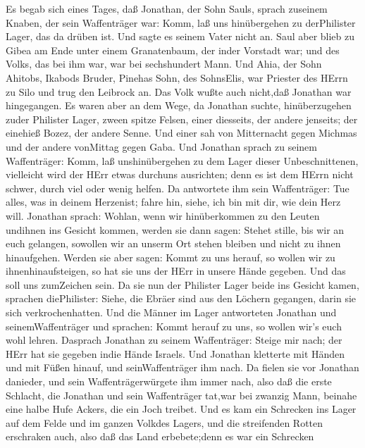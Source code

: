  Es begab sich eines Tages, daß Jonathan, der Sohn Sauls,
sprach zuseinem Knaben, der sein Waffenträger war: Komm, laß uns
hinübergehen zu derPhilister Lager, das da drüben ist. Und sagte es
seinem Vater nicht an.  Saul aber blieb zu Gibea am Ende
unter einem Granatenbaum, der inder Vorstadt war; und des Volks, das bei
ihm war, war bei sechshundert Mann.  Und Ahia, der Sohn
Ahitobs, Ikabods Bruder, Pinehas Sohn, des SohnsElis, war Priester des
HErrn zu Silo und trug den Leibrock an. Das Volk wußte auch nicht,daß
Jonathan war hingegangen.  Es waren aber an dem Wege, da
Jonathan suchte, hinüberzugehen zuder Philister Lager, zween spitze
Felsen, einer diesseits, der andere jenseits; der einehieß Bozez, der
andere Senne.  Und einer sah von Mitternacht gegen Michmas
und der andere vonMittag gegen Gaba.  Und Jonathan sprach zu
seinem Waffenträger: Komm, laß unshinübergehen zu dem Lager dieser
Unbeschnittenen, vielleicht wird der HErr etwas durchuns ausrichten;
denn es ist dem HErrn nicht schwer, durch viel oder wenig helfen.
 Da antwortete ihm sein Waffenträger: Tue alles, was in
deinem Herzenist; fahre hin, siehe, ich bin mit dir, wie dein Herz will.
 Jonathan sprach: Wohlan, wenn wir hinüberkommen zu den
Leuten undihnen ins Gesicht kommen,  werden sie dann sagen:
Stehet stille, bis wir an euch gelangen, sowollen wir an unserm Ort
stehen bleiben und nicht zu ihnen hinaufgehen.  Werden sie
aber sagen: Kommt zu uns herauf, so wollen wir zu ihnenhinaufsteigen, so
hat sie uns der HErr in unsere Hände gegeben. Und das soll uns
zumZeichen sein.  Da sie nun der Philister Lager beide ins
Gesicht kamen, sprachen diePhilister: Siehe, die Ebräer sind aus den
Löchern gegangen, darin sie sich verkrochenhatten.  Und die
Männer im Lager antworteten Jonathan und seinemWaffenträger und
sprachen: Kommt herauf zu uns, so wollen wir's euch wohl lehren.
Dasprach Jonathan zu seinem Waffenträger: Steige mir nach; der HErr hat
sie gegeben indie Hände Israels.  Und Jonathan kletterte
mit Händen und mit Füßen hinauf, und seinWaffenträger ihm nach. Da
fielen sie vor Jonathan danieder, und sein Waffenträgerwürgete ihm immer
nach,  also daß die erste Schlacht, die Jonathan und sein
Waffenträger tat,war bei zwanzig Mann, beinahe eine halbe Hufe Ackers,
die ein Joch treibet.  Und es kam ein Schrecken ins Lager
auf dem Felde und im ganzen Volkdes Lagers, und die streifenden Rotten
erschraken auch, also daß das Land erbebete;denn es war ein Schrecken
